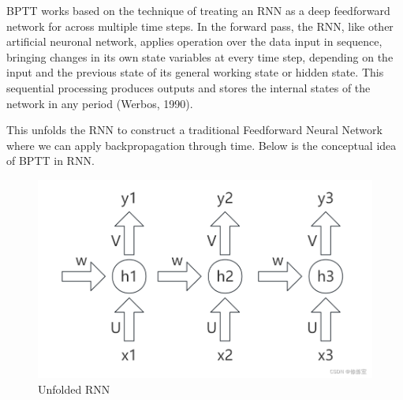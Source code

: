 \documentclass[12pt,a4paper]{article}
\begin{document}
BPTT works based on the technique of treating an RNN as a deep feedforward network for across multiple time steps. In the forward pass, the RNN, like other artificial neuronal network, applies operation over the data input in sequence, bringing changes in its own state variables at every time step, depending on the input and the previous state of its general working state or hidden state. This sequential processing produces outputs and stores the internal states of the network in any period (Werbos, 1990).

This unfolds the RNN to construct a traditional Feedforward Neural Network where we can apply backpropagation through time. Below is the conceptual idea of BPTT in RNN.
\begin{figure}[h!]
    \centering
    \includegraphics[width=1\textwidth]{./Pic/pic1.png} %
    \caption{Unfolded RNN}
\end{figure}
\end{document}
